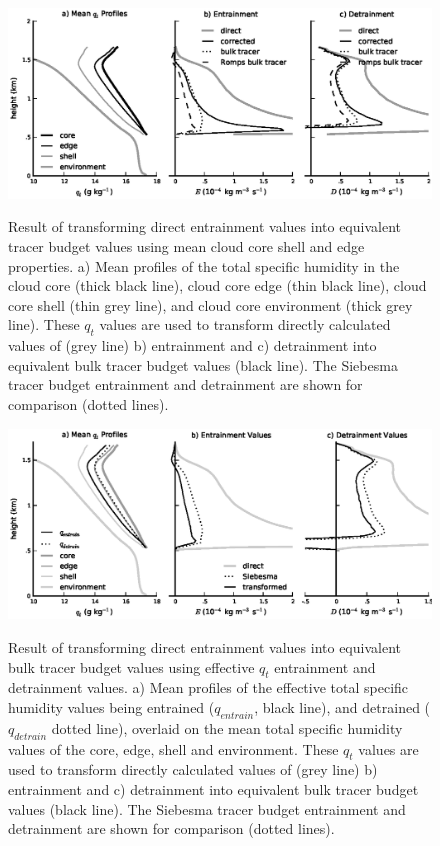 \documentclass[12pt]{article}
\begin{document}
\begin{figure}[t]
  \noindent\includegraphics[width=39pc,angle=0]{./figures/shell_correction}\\
  \caption{Result of transforming direct entrainment values into equivalent 
  tracer budget values using mean cloud core shell and edge properties.  
  a) Mean profiles of the total specific humidity in the cloud core (thick 
  black line), cloud core edge (thin black line), cloud core shell (thin 
  grey line), and cloud core environment (thick grey line).  These $q_t$ 
  values are used to transform directly calculated values of (grey line) 
  b) entrainment and c) detrainment into equivalent bulk tracer budget 
  values (black line).  The Siebesma tracer budget entrainment and detrainment
  are shown for comparison (dotted lines).}
  \label{fig:Shell_correction}
\end{figure}

\begin{figure}[t]
  \noindent\includegraphics[width=39pc,angle=0]{./figures/reynolds_correction}\\
  \caption{Result of transforming direct entrainment values into equivalent 
  bulk tracer budget values using effective $q_t$ entrainment and detrainment 
  values.  a) Mean profiles of the effective total specific humidity values being
  entrained ($q_{entrain}$, black line), and detrained ($q_{detrain}$ dotted
  line), overlaid on the mean total specific humidity values of the core, edge, 
  shell and environment.  These $q_t$ values are used to transform directly 
  calculated values of (grey line) b) entrainment and c) detrainment into 
  equivalent bulk tracer budget values (black line).  The Siebesma tracer 
  budget entrainment and detrainment are shown for comparison (dotted lines).}
  \label{fig:Reynolds_correction}
\end{figure}
\end{document}
